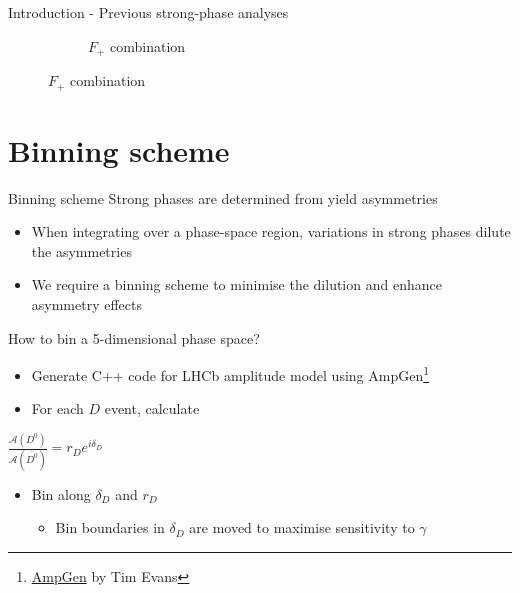 \documentclass{beamer}
\begin{document}
\begin{frame}{Introduction - Previous strong-phase analyses}
\begin{figure}
\begin{subfigure}{0.50\textwidth}
      \caption{$F_+$ combination}
    \end{subfigure}
  \end{figure}
\end{frame}

\section{Binning scheme}
\begin{frame}{Binning scheme}
  \vspace{0.0cm}
  {\Large Strong phases are determined from yield asymmetries}
  \begin{itemize}
    \item{When integrating over a phase-space region, variations in strong phases dilute the asymmetries}
    \item{We require a binning scheme to minimise the dilution and enhance asymmetry effects}
  \end{itemize}
  \vspace{0.4cm}
  {\Large How to bin a 5-dimensional phase space?}
  \begin{itemize}
    \item{Generate C++ code for LHCb amplitude model using AmpGen\footnote{\href{https://github.com/GooFit/AmpGen}{AmpGen} by Tim Evans}}
    \item{For each $D$ event, calculate}
  \end{itemize}
  \begin{center}
    {\Large $\frac{\mathcal{A}(D^0)}{\mathcal{A}(\bar{D^0})} = r_De^{i\delta_D}$}
  \end{center}
  \begin{itemize}
    \item{Bin along $\delta_D$ and $r_D$}
    \begin{itemize}
      \item{Bin boundaries in $\delta_D$ are moved to maximise sensitivity to $\gamma$}
    \end{itemize}
  \end{itemize}
\end{frame}
\end{document}
